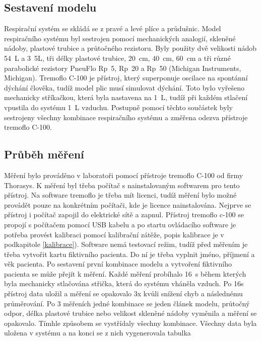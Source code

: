\subsection{Sestavení modelu}
Respirační systém se skládá se z pravé a levé plíce a průdušnic. Model respiračního systému  byl sestrojen pomocí mechanických analogií, skleněné nádoby, plastové trubice a průtočného rezistoru. Byly použity dvě velikosti nádob 54~L a 3~5L, tři délky plastové trubice, 20~cm, 40~cm, 60~cm  a tři různé parabolické rezistory PneuFlo Rp~5, Rp~20 a Rp~50 (Michigan Instruments, Michigan). 
Tremoflo C-100 je přístroj, který superponuje oscilace na spontánní dýchání člověka, tudíž model plic musí simulovat dýchání. Toto bylo vyřešeno mechanicky stříkačkou, která byla nastavena na 1~L, tudíž při každém stlačení vpustila do systému 1~L vzduchu. 
Postupně pomocí těchto součástek byly sestrojeny všechny kombinace respiračního systému a změřena odezva přístroje tremoflo C-100.

\subsection{Průběh měření}
Měření bylo prováděno v laboratoři pomocí přístroje tremoflo C-100 od firmy Thorasys. K měření byl třeba počítač s nainstalovaným softwarem pro tento přístroj. Na software tremoflo je třeba mít licenci, tudíž měření bylo možné provádět pouze na konkrétním počítači, kde je licence nainstalována.  Nejprve se přístroj i počítač zapojil do elektrické sítě a zapnul. Přístroj tremoflo c-100 se propojí s počítačem pomocí USB kabelu a po startu ovládacího software je potřeba provést kalibraci pomocí kalibrační zátěže, popis kalibrace je v podkapitole \ref{kalibrace}). Software nemá testovací režim, tudíž před měřením je třeba vytvořit kartu fiktivního pacienta. Do ní je třeba vyplnit  jméno, příjmení a věk pacienta. Po sestavení první kombinace modelu a vytvoření fiktivního pacienta se může přejít k měření. Každé měření probíhalo 16~s během kterých byla mechanicky stlačována střička, která do systému vháněla vzduch. Po 16s přístroj data uložil a měření se opakovalo 3x kvůli snížení chyb a následnému průměrování. Po 3 měřeních jedné kombinace se jeden článek modelu, průtočný odpor, délka plastové trubice nebo velikost skleněné nádoby vyměnila a měření se opakovalo. Tímhle způsobem se vystřídaly všechny kombinace. Všechny data byla uložena v systému a na konci se z nich vygenerovala tabulka

